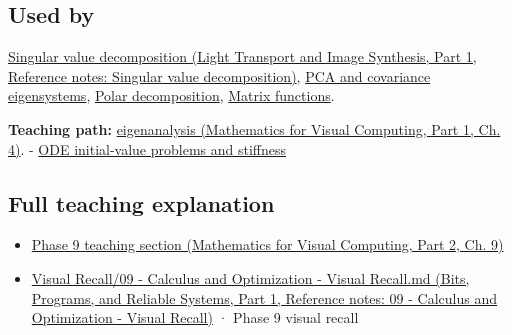 \subsection{Used by}\label{appendix-0b3be18411f9-used-by}

\hypertarget{appendix-0b3be18411f9-used-by}{}

\href{../04-Light-Transport-and-Image-Synthesis-P01/main.pdf\#nameddest=appendix-1fad5e7f36fa}{Singular value decomposition (Light Transport and Image Synthesis, Part 1, Reference notes: Singular value decomposition)}, \hyperref[appendix-ad175ef3c5bf]{PCA and covariance eigensystems}, \hyperref[appendix-73f5bcf7a462]{Polar decomposition}, \hyperref[appendix-0f4bc2bf2b1f]{Matrix functions}.

\textbf{Teaching path:} \href{../02-Mathematics-for-Visual-Computing-P01/main.pdf\#nameddest=01-foundations-i-ch020-eigenvectors-reveal-the-directions-a-square-map-does-not-turn}{eigenanalysis (Mathematics for Visual Computing, Part 1, Ch. 4)}. - \hyperref[appendix-e8ab9836882e]{ODE initial-value problems and stiffness}

\subsection{Full teaching explanation}\label{appendix-0b3be18411f9-full-teaching-explanation}

\hypertarget{appendix-0b3be18411f9-full-teaching-explanation}{}

\begin{itemize}
\tightlist
\item
  \href{../02-Mathematics-for-Visual-Computing-P02/main.pdf\#nameddest=02-foundations-ii-ch025-odes-and-numerical-simulation}{Phase 9 teaching section (Mathematics for Visual Computing, Part 2, Ch. 9)}
\item
  \href{../01-Bits-Programs-and-Reliable-Systems-P01/main.pdf\#nameddest=appendix-adf48f5dc5c1}{Visual Recall/09 - Calculus and Optimization - Visual Recall.md (Bits, Programs, and Reliable Systems, Part 1, Reference notes: 09 - Calculus and Optimization - Visual Recall)} · Phase 9 visual recall
\end{itemize}
